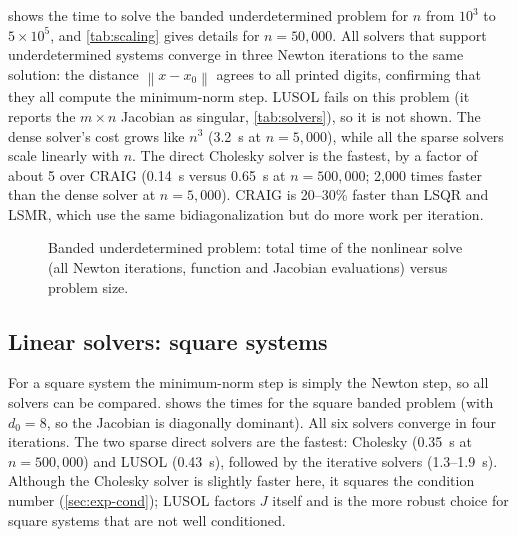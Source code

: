\documentclass[11pt]{article}
\newcommand{\norm}[1]{\left\lVert #1 \right\rVert}
\begin{document}
 shows the time to solve the banded underdetermined problem for $n$ from
$10^3$ to $5\times 10^5$, and \cref{tab:scaling} gives details for $n = 50{,}000$.
All solvers that support underdetermined systems converge in three Newton iterations to the same
solution: the distance $\norm{x - x_0}$ agrees to all printed digits, confirming that they all
compute the minimum-norm step. LUSOL fails on this problem (it reports the $m \times n$ Jacobian as
singular, \cref{tab:solvers}), so it is not shown. The dense solver's cost grows like $n^3$ (3.2~s
at $n = 5{,}000$), while all the sparse solvers scale linearly with $n$. The direct Cholesky solver is
the fastest, by a factor of about 5 over CRAIG (0.14~s versus 0.65~s at $n = 500{,}000$; 2,000 times
faster than the dense solver at $n = 5{,}000$). CRAIG is 20--30\% faster than LSQR and LSMR, which use the
same bidiagonalization but do more work per iteration.

\begin{figure}[htbp]
\centering
{}
\caption{Banded underdetermined problem: total time of the nonlinear solve (all Newton iterations,
function and Jacobian evaluations) versus problem size.}
\label{fig:scaling}
\end{figure}



\subsection{Linear solvers: square systems}
\label{sec:exp-square}
For a square system the minimum-norm step is simply the Newton step, so all solvers can be compared.
 shows the times for the square banded problem (with $d_0 = 8$, so the Jacobian is
diagonally dominant). All six solvers converge in four iterations. The two sparse direct solvers are
the fastest: Cholesky (0.35~s at $n = 500{,}000$) and LUSOL (0.43~s), followed by the iterative solvers
(1.3--1.9~s). Although the Cholesky solver is slightly faster here, it squares the condition number
(\cref{sec:exp-cond}); LUSOL factors $J$ itself and is the more robust choice for square systems that are
not well conditioned.
\end{document}
